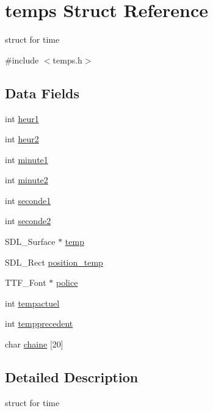 \hypertarget{structtemps}{}\section{temps Struct Reference}
\label{structtemps}


struct for time  




{\ttfamily \#include $<$temps.\+h$>$}

\subsection*{Data Fields}
\begin{DoxyCompactItemize}
\item 
int \hyperlink{structtemps_a2011835f5e7a49a1233eda77a44dd2e5}{heur1}
\item 
int \hyperlink{structtemps_a54b7d1185a09a8fb91dba7e6509bcd15}{heur2}
\item 
int \hyperlink{structtemps_a400cb69ff8af9b43eb6abab78fa0161c}{minute1}
\item 
int \hyperlink{structtemps_a2414045fced292cf676b7fd59ec9181c}{minute2}
\item 
int \hyperlink{structtemps_a5c5612243cfd9e4e379f5c3d8b60fa01}{seconde1}
\item 
int \hyperlink{structtemps_a7fcb75d6c82d79b83d53c2312e2b86a0}{seconde2}
\item 
S\+D\+L\+\_\+\+Surface $\ast$ \hyperlink{structtemps_aab50e212cfeca5de8ced5c501f0120ba}{temp}
\item 
S\+D\+L\+\_\+\+Rect \hyperlink{structtemps_a77d09ab78c81ed3951ff41e1974cc14d}{position\+\_\+temp}
\item 
T\+T\+F\+\_\+\+Font $\ast$ \hyperlink{structtemps_a5496aa7ef92a402878dfa83dc44cb570}{police}
\item 
int \hyperlink{structtemps_ab07c63dc7591472ca0214e52ff4cb014}{tempactuel}
\item 
int \hyperlink{structtemps_a94454b9ce545c311e78f31f7add21952}{tempprecedent}
\item 
char \hyperlink{structtemps_a7887aa391bcc303452f3b173e5ba89ce}{chaine} \mbox{[}20\mbox{]}
\end{DoxyCompactItemize}


\subsection{Detailed Description}
struct for time 


